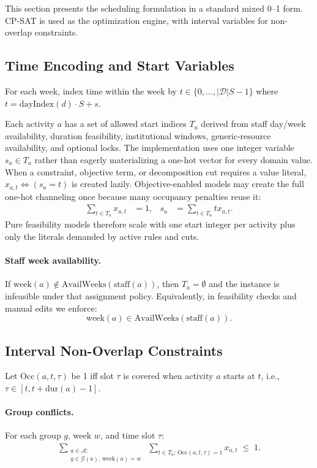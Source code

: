 This section presents the scheduling formulation in a standard mixed 0--1 form.
CP-SAT is used as the optimization engine, with interval variables for non-overlap constraints.

\subsection{Time Encoding and Start Variables}
For each week, index time within the week by $t \in \{0,\dots,|\mathcal{D}|S-1\}$ where
$t = \mathrm{dayIndex}(d)\cdot S + s$.

Each activity $a$ has a set of allowed start indices $T_a$ derived from staff
day/week availability, duration feasibility, institutional windows, generic-resource availability, and optional locks.
The implementation uses one integer variable $s_a\in T_a$ rather than eagerly materializing a one-hot vector for every domain value.
When a constraint, objective term, or decomposition cut requires a value literal, $x_{a,t}\Leftrightarrow(s_a=t)$ is created lazily.
Objective-enabled models may create the full one-hot channeling once because many occupancy penalties reuse it:
\begin{align}
\sum_{t\in T_a} x_{a,t} &= 1, &
s_a &= \sum_{t\in T_a}t x_{a,t}. \label{eq:oneStart}
\end{align}
Pure feasibility models therefore scale with one start integer per activity plus only the literals demanded by active rules and cuts.

\paragraph{Staff week availability.}
If $\mathrm{week}(a)\notin \mathrm{AvailWeeks}(\mathrm{staff}(a))$, then
$T_a=\emptyset$ and the instance is infeasible under that assignment policy.
Equivalently, in feasibility checks and manual edits we enforce:
\[
\mathrm{week}(a)\in \mathrm{AvailWeeks}(\mathrm{staff}(a)).
\]

\subsection{Interval Non-Overlap Constraints}
Let $\mathrm{Occ}(a,t,\tau)$ be 1 iff slot $\tau$ is covered when activity $a$ starts at $t$, i.e.,
$\tau \in [t, t+\mathrm{dur}(a)-1]$.

\paragraph{Group conflicts.}
For each group $g$, week $w$, and time slot $\tau$:
\begin{align}
\sum_{\substack{a\in\mathcal{A}:\\ g\in\mathcal{G}(a),\,\mathrm{week}(a)=w}}
\;\sum_{t\in T_a:\,\mathrm{Occ}(a,t,\tau)=1} x_{a,t} \;\le\; 1.
\end{align}

